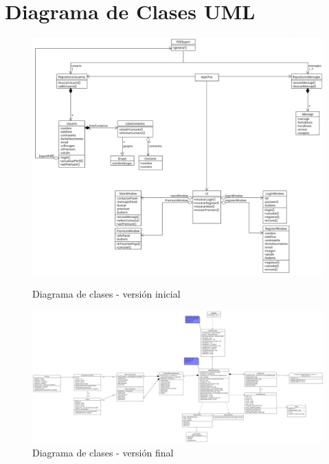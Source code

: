 \newpage
{}
\section*{Diagrama de Clases UML}

\begin{figure}[H]
    \centering
    \begin{minipage}{0.85\textwidth}
        \centering
        \includegraphics[width=\textwidth]{images/AppChat_Dominio_Inicial.png}
        \caption*{Diagrama de clases - versión inicial}
    \end{minipage}
    
    \vspace{1.5em}

    \begin{minipage}{0.85\textwidth}
        \centering
        \includegraphics[width=\textwidth]{images/AppChat_Dominio.png}
        \caption*{Diagrama de clases - versión final}
    \end{minipage}
\end{figure}
